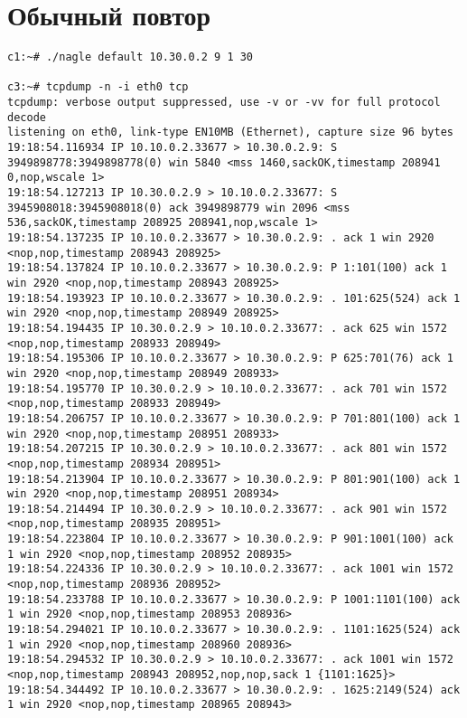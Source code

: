 \documentclass[a4paper,12pt]{article}
\begin{document}
\section{Обычный повтор}

\begin{lstlisting}
c1:~# ./nagle default 10.30.0.2 9 1 30

c3:~# tcpdump -n -i eth0 tcp
tcpdump: verbose output suppressed, use -v or -vv for full protocol decode
listening on eth0, link-type EN10MB (Ethernet), capture size 96 bytes
19:18:54.116934 IP 10.10.0.2.33677 > 10.30.0.2.9: S 3949898778:3949898778(0) win 5840 <mss 1460,sackOK,timestamp 208941 0,nop,wscale 1>
19:18:54.127213 IP 10.30.0.2.9 > 10.10.0.2.33677: S 3945908018:3945908018(0) ack 3949898779 win 2096 <mss 536,sackOK,timestamp 208925 208941,nop,wscale 1>
19:18:54.137235 IP 10.10.0.2.33677 > 10.30.0.2.9: . ack 1 win 2920 <nop,nop,timestamp 208943 208925>
19:18:54.137824 IP 10.10.0.2.33677 > 10.30.0.2.9: P 1:101(100) ack 1 win 2920 <nop,nop,timestamp 208943 208925>
19:18:54.193923 IP 10.10.0.2.33677 > 10.30.0.2.9: . 101:625(524) ack 1 win 2920 <nop,nop,timestamp 208949 208925>
19:18:54.194435 IP 10.30.0.2.9 > 10.10.0.2.33677: . ack 625 win 1572 <nop,nop,timestamp 208933 208949>
19:18:54.195306 IP 10.10.0.2.33677 > 10.30.0.2.9: P 625:701(76) ack 1 win 2920 <nop,nop,timestamp 208949 208933>
19:18:54.195770 IP 10.30.0.2.9 > 10.10.0.2.33677: . ack 701 win 1572 <nop,nop,timestamp 208933 208949>
19:18:54.206757 IP 10.10.0.2.33677 > 10.30.0.2.9: P 701:801(100) ack 1 win 2920 <nop,nop,timestamp 208951 208933>
19:18:54.207215 IP 10.30.0.2.9 > 10.10.0.2.33677: . ack 801 win 1572 <nop,nop,timestamp 208934 208951>
19:18:54.213904 IP 10.10.0.2.33677 > 10.30.0.2.9: P 801:901(100) ack 1 win 2920 <nop,nop,timestamp 208951 208934>
19:18:54.214494 IP 10.30.0.2.9 > 10.10.0.2.33677: . ack 901 win 1572 <nop,nop,timestamp 208935 208951>
19:18:54.223804 IP 10.10.0.2.33677 > 10.30.0.2.9: P 901:1001(100) ack 1 win 2920 <nop,nop,timestamp 208952 208935>
19:18:54.224336 IP 10.30.0.2.9 > 10.10.0.2.33677: . ack 1001 win 1572 <nop,nop,timestamp 208936 208952>
19:18:54.233788 IP 10.10.0.2.33677 > 10.30.0.2.9: P 1001:1101(100) ack 1 win 2920 <nop,nop,timestamp 208953 208936>
19:18:54.294021 IP 10.10.0.2.33677 > 10.30.0.2.9: . 1101:1625(524) ack 1 win 2920 <nop,nop,timestamp 208960 208936>
19:18:54.294532 IP 10.30.0.2.9 > 10.10.0.2.33677: . ack 1001 win 1572 <nop,nop,timestamp 208943 208952,nop,nop,sack 1 {1101:1625}>
19:18:54.344492 IP 10.10.0.2.33677 > 10.30.0.2.9: . 1625:2149(524) ack 1 win 2920 <nop,nop,timestamp 208965 208943>

\end{lstlisting}
\end{document}
